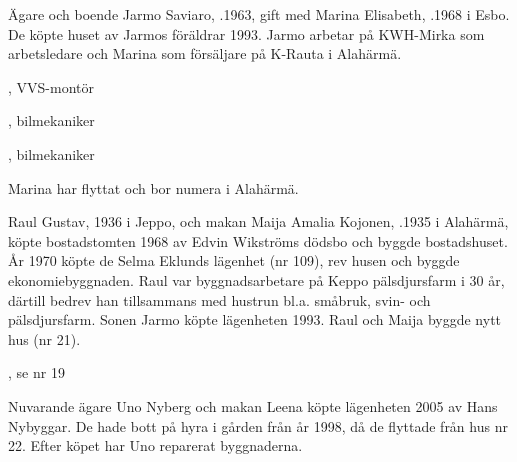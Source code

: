 %
Ägare och boende Jarmo Saviaro, .1963, gift med Marina Elisabeth, .1968 i Esbo. De köpte huset av Jarmos föräldrar 1993. Jarmo arbetar på KWH-Mirka som arbetsledare och Marina som försäljare på K-Rauta i Alahärmä.
\begin{jhchildren}
  \item {}, VVS-montör
  \item {}, bilmekaniker
  \item {}, bilmekaniker
\end{jhchildren}
Marina har flyttat och bor numera i Alahärmä.


%
Raul Gustav,  1936 i Jeppo, och makan Maija Amalia Kojonen, .1935 i Alahärmä, köpte bostadstomten 1968 av Edvin Wikströms dödsbo och byggde bostadshuset. År 1970 köpte de Selma Eklunds lägenhet (nr 109), rev husen och byggde ekonomiebyggnaden. Raul var byggnadsarbetare på Keppo pälsdjursfarm i 30 år, därtill bedrev han tillsammans med hustrun bl.a. småbruk, svin- och pälsdjursfarm. Sonen Jarmo köpte lägenheten 1993. Raul och Maija byggde nytt hus (nr 21).
\begin{jhchildren}
  \item {}, se nr 19
  \item {}
\end{jhchildren}



%


%
Nuvarande ägare Uno Nyberg och makan Leena köpte lägenheten 2005 av Hans Nybyggar. De hade bott på hyra i gården från år 1998, då de flyttade från hus nr 22. Efter köpet har Uno reparerat byggnaderna.\jhvspace{}



